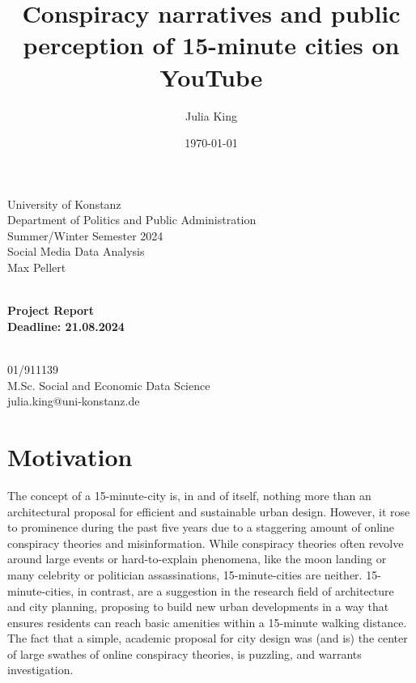 \documentclass[fontsize=11pt, parskip=half]{scrartcl}
\title{Conspiracy narratives and public perception of 15-minute cities on YouTube}\let\Title\@title
\author{Julia King}          \let\Author\@author
\date{\today}           \let\Date\@date
\makeatletter
\def \papersubtitle {Project Report}
\def \paperdeadline {21.08.2024}
\def \paperevaluator {Max Pellert}
\def \paperseminar {Social Media Data Analysis}
\def \papersemester {Summer/Winter Semester 2024}
\def \paperdepartment {Department of Politics and Public Administration}
\def \paperuniversity {University of Konstanz}
\def \paperemail {julia.king@uni-konstanz.de}
\def \paperprogramme {M.Sc. Social and Economic Data Science}
\def \papermatriculationnr {01/911139}
\makeatother
\begin{document}
\setlength{\columnsep}{25pt}

\begin{titlepage}
    \newcommand{\HRule}{\rule{\linewidth}{0.5mm}}
    
    \begin{flushleft} %
        \large
        \paperuniversity\\
        \paperdepartment\\
        \papersemester\\
        \paperseminar\\
        \paperevaluator
    \end{flushleft}
    
    \vfill
    
    \begin{center} %
        \huge\bfseries \Title\\
        \vspace{0.5cm}
        \large \papersubtitle \\
        \vspace{0.5cm}
        \small Deadline: \paperdeadline
    \end{center}
    
    \vfill
    
    \begin{flushright} %
        \large
        \Author\\
        \papermatriculationnr\\
        \paperprogramme\\
        \paperemail
    \end{flushright}
\end{titlepage}

\clearpage
\setcounter{page}{1}

\section{Motivation}
\label{section:motivation}

    The concept of a 15-minute-city is, in and of itself, nothing more than an architectural proposal for efficient and sustainable urban design. However, it rose to prominence during the past five years due to a staggering amount of online conspiracy theories and misinformation. While conspiracy theories often revolve around large events or hard-to-explain phenomena, like the moon landing or many celebrity or politician assassinations, 15-minute-cities are neither. 15-minute-cities, in contrast, are a suggestion in the research field of architecture and city planning, proposing to build new urban developments in a way that ensures residents can reach basic amenities within a 15-minute walking distance. The fact that a simple, academic proposal for city design was (and is) the center of large swathes of online conspiracy theories, is puzzling, and warrants investigation. 
    
\end{document}
